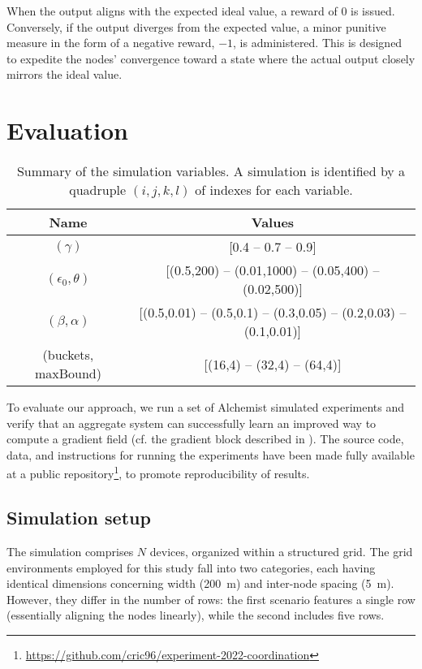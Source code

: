 When the output aligns with the expected ideal value, a reward of $0$ is issued. Conversely, if the output diverges from the expected value, 
 a minor punitive measure in the form of a negative reward, $-1$, is administered. This is designed to expedite the nodes' convergence toward a state where the actual output closely mirrors the ideal value.
\section{Evaluation}\label{coordination2022:s:eval}

\begin{table}[t]
  \centering
  \begin{tabular}{|c|c|}
    \hline
    Name &  Values \\ \hline
    $(\gamma)$ & [0.4 -- 0.7 -- 0.9] \\  \hline
    $(\epsilon_0, \theta)$ & [(0.5,200) -- (0.01,1000) -- (0.05,400) -- (0.02,500)] \\ \hline
    $(\beta, \alpha)$ & [(0.5,0.01) -- (0.5,0.1) -- (0.3,0.05) -- (0.2,0.03) -- (0.1,0.01)]
    \\  \hline
    (buckets, maxBound) & [(16,4) -- (32,4) -- (64,4)]\\ \hline
  \end{tabular}
  \caption{Summary of the simulation variables. 
  A simulation is identified by a quadruple $(i, j, k, l)$ of indexes for each variable. 
  }
  \label{coordination2022:table:parameters}
\end{table}

To evaluate our approach, we run a set of Alchemist simulated experiments and verify that an aggregate system
 can successfully learn an improved way to compute a gradient field (cf. the gradient block described in ).
%
The source code, data, and instructions for running the experiments have been made fully available at a public repository\footnote{\url{https://github.com/cric96/experiment-2022-coordination}}, to promote reproducibility of results.

\subsection{Simulation setup}

The simulation comprises $N$ devices, 
 organized within a structured grid. 
 The grid environments employed for this study fall into two categories, 
 each having identical dimensions concerning width (\SI{200}{\metre}) and inter-node spacing (\SI{5}{\metre}). 
 However, they differ in the number of rows: 
 the first scenario features a single row (essentially aligning the nodes linearly), while the second includes five rows.

